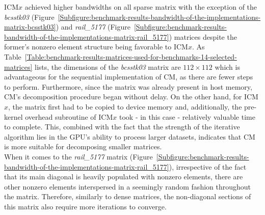 \par ICM$ x $ achieved higher bandwidths on all sparse matrix with the exception of the \textit{bcsstk03} (Figure~\ref{Subfigure:benchmark-results-bandwidth-of-the-implementations-matrix-bcsstk03}) and \textit{rail\_5177} (Figure~\ref{Subfigure:benchmark-results-bandwidth-of-the-implementations-matrix-rail_5177}) matrices despite the former's nonzero element structure being favorable to ICM$ x $. As Table~\ref{Table:benchmark-results-matrices-used-for-benchmarks-14-selected-matrices} lists, the dimensions of the \textit{bcsstk03} matrix are $ 112\times 112 $ which is advantageous for the sequential implementation of CM, as there are fewer steps to perform. Furthermore, since the matrix was already present in host memory, CM's decomposition procedure began without delay. On the other hand, for ICM$ x $, the matrix first had to be copied to device memory and, additionally, the pre-kernel overhead subroutine of ICM$ x $ took - in this case - relatively valuable time to complete. This, combined with the fact that the strength of the iterative algorithm lies in the GPU's ability to process larger datasets, indicates that CM is more suitable for decomposing smaller matrices. \\
When it comes to the \textit{rail\_5177} matrix (Figure~\ref{Subfigure:benchmark-results-bandwidth-of-the-implementations-matrix-rail_5177}), irrespective of the fact that its main diagonal is heavily populated with nonzero elements, there are other nonzero elements interspersed in a seemingly random fashion throughout the matrix. Therefore, similarly to dense matrices, the non-diagonal sections of this matrix also require more iterations to converge.


